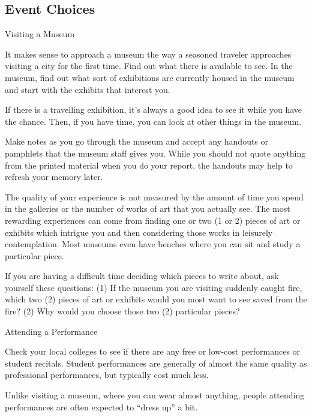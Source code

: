 \subsection*{Event Choices}
\begin{enumerate*}
	\item Visiting a Museum
		\begin{itemize*}
			\item It makes sense to approach a museum the way a seasoned traveler approaches visiting a city for the first time. Find out what there is available to see. In the museum, find out what sort of exhibitions are currently housed in the museum and start with the exhibits that interest you.
			\item If there is a travelling exhibition, it's always a good idea to see it while you have the chance. Then, if you have time, you can look at other things in the museum.
			\item Make notes as you go through the museum and accept any handouts or pamphlets that the museum staff gives you. While you should not quote anything from the printed material when you do your report, the handouts may help to refresh your memory later.
			\item The quality of your experience is not measured by the amount of time you spend in the galleries or the number of works of art that you actually see. The most rewarding experiences can come from finding one or two (1 or 2) pieces of art or exhibits which intrigue you and then considering those works in leisurely contemplation. Most museums even have benches where you can sit and study a particular piece.
			\item If you are having a difficult time deciding which pieces to write about, ask yourself these questions: (1) If the museum you are visiting suddenly caught fire, which two (2) pieces of art or exhibits would you most want to see saved from the fire? (2) Why would you choose those two (2) particular pieces?
		\end{itemize*}
	\item Attending a Performance
		\begin{itemize*}
			\item Check your local colleges to see if there are any free or low-cost performances or student recitals. Student performances are generally of almost the same quality as professional performances, but typically cost much less.
			\item Unlike visiting a museum, where you can wear almost anything, people attending performances are often expected to ``dress up'' a bit.

\end{itemize*}
\end{enumerate*}
